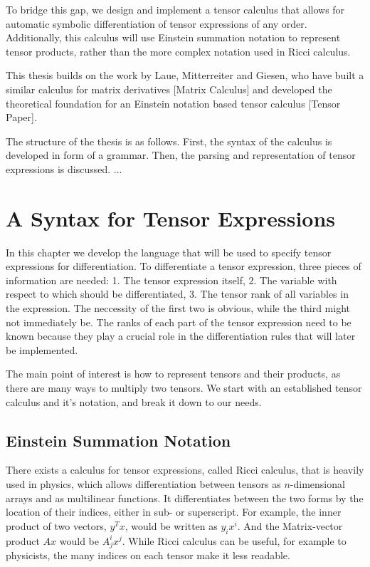 \documentclass[12pt, a4paper]{report}
\begin{document}
To bridge this gap, we design and implement a tensor calculus that allows for automatic symbolic differentiation of tensor expressions of any order.
Additionally, this calculus will use Einstein summation notation to represent tensor products, rather than the more complex notation used in Ricci calculus.

This thesis builds on the work by Laue, Mitterreiter and Giesen, who have built a similar calculus for matrix derivatives [Matrix Calculus] and developed the theoretical foundation for an Einstein notation based tensor calculus [Tensor Paper].

The structure of the thesis is as follows.
First, the syntax of the calculus is developed in form of a grammar.
Then, the parsing and representation of tensor expressions is discussed.
...

\chapter{A Syntax for Tensor Expressions}
In this chapter we develop the language that will be used to specify tensor expressions for differentiation.
To differentiate a tensor expression, three pieces of information are needed: 1. The tensor expression itself, 2. The variable with respect to which should be differentiated, 3. The tensor rank of all variables in the expression.
The neccessity of the first two is obvious, while the third might not immediately be.
The ranks of each part of the tensor expression need to be known because they play a crucial role in the differentiation rules that will later be implemented.

The main point of interest is how to represent tensors and their products, as there are many ways to multiply two tensors.
We start with an established tensor calculus and it's notation, and break it down to our needs.

\section{Einstein Summation Notation}
There exists a calculus for tensor expressions, called Ricci calculus, that is heavily used in physics, which allows differentiation between tensors as $n$-dimensional arrays and as multilinear functions.
It differentiates between the two forms by the location of their indices, either in sub- or superscript.
For example, the inner product of two vectors, $y^Tx$, would be written as $y_ix^i$. And the Matrix-vector product $Ax$ would be $A^i_jx^j$.
While Ricci calculus can be useful, for example to physicists, the many indices on each tensor make it less readable.
\end{document}
